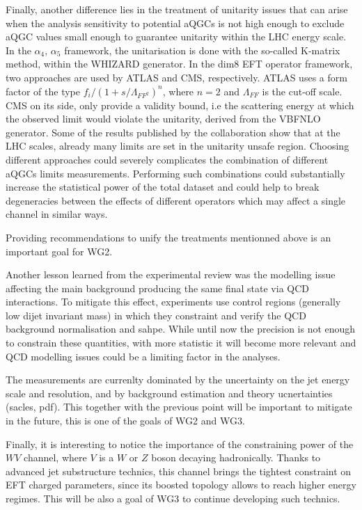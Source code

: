 Finally, another difference lies in the treatment of unitarity issues that can arise when the analysis sensitivity to potential aQGCs is not high enough to exclude aQGC values small enough to guarantee unitarity within the LHC energy scale. In the $\alpha_4$, $\alpha_5$ framework, the unitarisation is done with the so-called K-matrix method, within the WHIZARD generator. In the dim8 EFT operator framework, two approaches are used by ATLAS and CMS, respectively. ATLAS uses a form factor of the type $f_i/(1+s/\Lambda_{FF^2})^n$, where $n=2$ and $\Lambda_{FF}$ is the cut-off scale. CMS on its side, only provide a validity bound, i.e the scattering energy at which the observed limit would violate the unitarity, derived from the VBFNLO generator. Some of the results published by the collaboration show that at the LHC scales, already many limits are set in the unitarity unsafe region. 
Choosing different approaches could severely complicates the combination of different aQGCs limits measurements. Performing such combinations could substantially increase the statistical power of the total dataset and could help to break degeneracies between the effects of different operators which may affect a single channel in similar ways.

Providing recommendations to unify the treatments mentionned above is an important goal for WG2. 

Another lesson learned from the experimental review was the modelling issue affecting the main background producing the same final state via QCD interactions. To mitigate this effect, experiments use control regions (generally low dijet invariant mass) in which they  constraint and verify the QCD background normalisation and sahpe. While until now the precision is not enough to constrain these quantities, with more statistic it will become more relevant and QCD modelling issues could be a limiting factor in the analyses.

The measurements are currenlty dominated by the uncertainty on the jet energy scale and resolution, and by background estimation and theory ucnertainties (sacles, pdf). This together with the previous point will be important to mitigate in the future, this is one of the goals of WG2 and WG3.
 
Finally, it is interesting to notice the importance of the constraining power of the $WV$ channel, where $V$ is a $W$ or $Z$ boson decaying hadronically. Thanks to advanced jet substructure technics, this channel brings the tightest constraint on EFT charged parameters, since its boosted topology allows to reach higher energy regimes. This will be also a goal of WG3 to continue developing such technics. 
